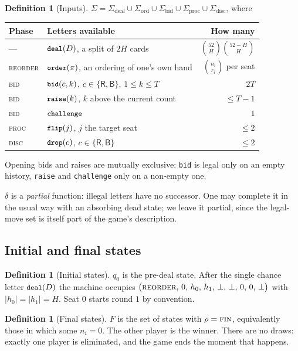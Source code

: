 \documentclass[11pt]{article}
\theoremstyle{plain}
\theoremstyle{definition}
\newtheorem{definition}[theorem]{Definition}
\theoremstyle{remark}
\newcommand{\R}{\ensuremath{\mathsf{R}}}
\newcommand{\B}{\ensuremath{\mathsf{B}}}
\newcommand{\Sig}{\ensuremath{\Sigma}}
\newcommand{\dtrans}{\ensuremath{\delta}}
\newcommand{\code}[1]{\texttt{\small #1}}
\begin{document}
\begin{definition}[Inputs]\label{def:inputs}
$\Sig=\Sig_{\mathrm{deal}}\cup\Sig_{\mathrm{ord}}\cup\Sig_{\mathrm{bid}}
       \cup\Sig_{\mathrm{proc}}\cup\Sig_{\mathrm{disc}}$, where
\begin{center}\small
\begin{tabular}{@{}llr@{}}
\toprule
Phase & Letters available & How many\\
\midrule
--- & $\code{deal}(D)$, a split of $2H$ cards & $\binom{52}{H}\binom{52-H}{H}$ \\
\textsc{reorder} & $\code{order}(\pi)$, an ordering of one's own hand & $\binom{n_i}{r_i}$ per seat\\
\textsc{bid} & $\code{bid}(c,k)$, $c\in\{\R,\B\}$, $1\le k\le T$ & $2T$\\
\textsc{bid} & $\code{raise}(k)$, $k$ above the current count & $\le T-1$\\
\textsc{bid} & $\code{challenge}$ & $1$\\
\textsc{proc} & $\code{flip}(j)$, $j$ the target seat & $\le 2$\\
\textsc{disc} & $\code{drop}(c)$, $c\in\{\R,\B\}$ & $\le 2$\\
\bottomrule
\end{tabular}
\end{center}
Opening bids and raises are mutually exclusive: \code{bid} is legal only on
an empty history, \code{raise} and \code{challenge} only on a non-empty one.
\end{definition}

$\dtrans$ is a \emph{partial} function: illegal letters have no successor.
One may complete it in the usual way with an absorbing dead state; we leave
it partial, since the legal-move set is itself part of the game's
description.

\subsection{Initial and final states}

\begin{definition}[Initial states]
$q_0$ is the pre-deal state. After the single chance letter
$\code{deal}(D)$ the machine occupies
$\bigl(\textsc{reorder},\,0,\,h_0,\,h_1,\,\bot,\,\bot,\,0,\,0,\,\bot\bigr)$
with $|h_0|=|h_1|=H$. Seat $0$ starts round $1$ by convention.
\end{definition}

\begin{definition}[Final states]
$F$ is the set of states with $\rho=\textsc{fin}$, equivalently those in
which some $n_i=0$. The other player is the winner. There are no draws:
exactly one player is eliminated, and the game ends the moment that
happens.
\end{definition}
\end{document}
